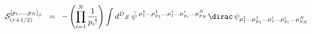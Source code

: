 \begin{equation}
{\cal{S}}^{{[ p_1 ,..., p_N ]}_S}_{(r+ 1/2)} \;\; =\;\; - \left(
\prod_{i=1}^{N} \frac{1}{p_i !} \right) \int d^D x \; {\bar{\psi}}^{\;
{\mu}^1_1 ...{\mu}^1_{p_1} ...{\mu}^i_1 ...{\mu}^i_{p_i}
...{\mu}^N_{p_N} } {\dirac} \, {\psi}_{ {\mu}^1_1 ...{\mu}^1_{p_1}
...{\mu}^i_1 ...{\mu}^i_{p_i} ...{\mu}^N_{p_N} }
\label{eq:3.8a}
\end{equation}

